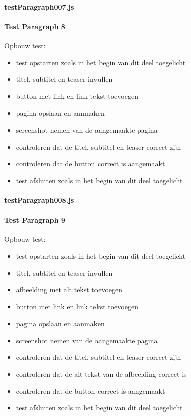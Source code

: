 \paragraph{testParagraph007.js}


\clearpage
\paragraph{Test Paragraph 8}
\label{test8}
Opbouw test: 
\begin{itemize}
\item test opstarten zoals in het begin van dit deel toegelicht
\item titel, subtitel en teaser invullen
\item button met link en link tekst toevoegen
\item pagina opslaan en aanmaken
\item screenshot nemen van de aangemaakte pagina
\item controleren dat de titel, subtitel en teaser correct zijn
\item controleren dat de button correct is aangemaakt
\item test afsluiten zoals in het begin van dit deel toegelicht
\end{itemize}
\paragraph{testParagraph008.js}


\clearpage
\paragraph{Test Paragraph 9}
\label{test9}
Opbouw test: 
\begin{itemize}
\item test opstarten zoals in het begin van dit deel toegelicht
\item titel, subtitel en teaser invullen
\item afbeelding met alt tekst toevoegen
\item button met link en link tekst toevoegen
\item pagina opslaan en aanmaken
\item screenshot nemen van de aangemaakte pagina
\item controleren dat de titel, subtitel en teaser correct zijn
\item controleren dat de alt tekst van de afbeelding correct is
\item controleren dat de button correct is aangemaakt
\item test afsluiten zoals in het begin van dit deel toegelicht
\end{itemize}
